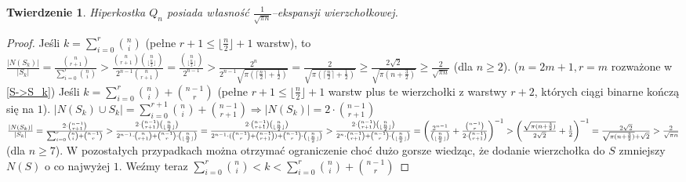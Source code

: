 \documentclass{pracamgr}
\newtheorem{theorem}{Twierdzenie}[chapter]
\begin{document}
   \begin{theorem}\label{ekspansja kostki}
    Hiperkostka $Q_n$ posiada własność $\frac{1}{\sqrt{\pi n}}$--ekspansji wierzchołkowej.
   \end{theorem}
   \begin{proof}
    Jeśli $k=\sum_{i=0}^{r}{n\choose i}$ (pełne $r+1\le\lfloor\frac{n}{2}\rfloor+1$ warstw), to
    $\frac{|N(S_k)|}{|S_k|}=\frac{{n\choose r+1}}{\sum_{i=0}^{r}{n \choose i}}>\frac{{n\choose r+1}{n\choose \lfloor\frac{n}{2}\rfloor}}{2^{n-1}{n\choose r+1}}
    =\frac{{n\choose \lfloor\frac{n}{2}\rfloor}}{2^{n-1}}>\frac{2^{n}}{2^{n-1}\sqrt{\pi (\lceil\frac{n}{2}\rceil+\frac{1}{2})}}=
    \frac{2}{\sqrt{\pi (\lceil\frac{n}{2}\rceil+\frac{1}{2})}}
    \ge\frac{2\sqrt{2}}{\sqrt{\pi (n+\frac{3}{2})}}\ge\frac{2}{\sqrt{\pi n}}$ (dla $n\ge2$).\newline
    ($n=2m+1,r=m$ rozważone w \ref{S->S_k})\newline
    Jeśli $k=\sum_{i=0}^{r}{n\choose i}+{n-1 \choose r}$
    (pełne $r+1\le\lfloor\frac{n}{2}\rfloor+1$ warstw plus te wierzchołki z warstwy $r+2$, których ciągi binarne kończą się na $1$).\newline
    $|N(S_k)\cup S_k|=\sum_{i=0}^{r+1}{n\choose i}+{n-1 \choose r+1}\Rightarrow |N(S_k)|=2\cdot{n-1\choose r+1}$\newline
    $\frac{|N(S_k)|}{|S_k|}=\frac{2\cdot{n-1 \choose r+1}}{\sum_{i=0}^{r}{n\choose i}+{n-1 \choose r}}>
    \frac{2\cdot{n-1\choose r+1}{n\choose\lfloor\frac{n}{2}\rfloor}}{2^{n-1}\cdot{n\choose r+1}+{n-1\choose r}\cdot{n\choose\lfloor\frac{n}{2}\rfloor}}=
    \frac{2\cdot{n-1\choose r+1}{n\choose\lfloor\frac{n}{2}\rfloor}}{2^{n-1}\cdot({n-1\choose r}+{n-1\choose r+1})+{n-1\choose r}\cdot{n\choose\lfloor\frac{n}{2}\rfloor}}>\newline
    \frac{2\cdot{n-1\choose r+1}{n\choose\lfloor\frac{n}{2}\rfloor}}{2^{n}\cdot{n-1\choose r+1}+{n-1\choose r}\cdot{n\choose\lfloor\frac{n}{2}\rfloor}}=
    \left(\frac{2^{n-1}}{{n\choose\lfloor\frac{n}{2}\rfloor}}+\frac{{n-1\choose r}}{2\cdot{n-1\choose r+1}}\right)^{-1}>
    \left(\frac{\sqrt{\pi(n+\frac{3}{2})}}{2\sqrt{2}}+\frac{1}{2}\right)^{-1}=\frac{2\sqrt{2}}{\sqrt{\pi(n+\frac{3}{2})}+\sqrt{2}}>\frac{2}{\sqrt{\pi n}}$ (dla $n\ge 7$).\newline
    W pozostałych przypadkach można otrzymać ograniczenie choć dużo gorsze wiedząc, że dodanie wierzchołka do $S$ zmniejszy $N(S)$ o co najwyżej $1$.\newline
    Weźmy teraz $\sum_{i=0}^{r}{n\choose i}<k<\sum_{i=0}^{r}{n\choose i}+{n-1 \choose r}$\newline

\end{proof}
\end{document}
